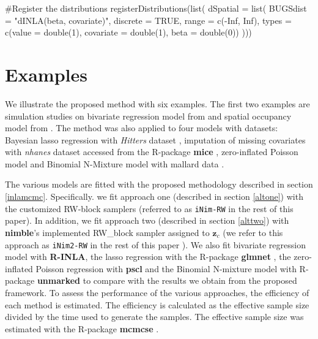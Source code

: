 \documentclass[
]{article}
\newenvironment{Shaded}{\begin{snugshade}}{\end{snugshade}}
\newcommand{\AttributeTok}[1]{\textcolor[rgb]{0.40,0.45,0.13}{#1}}
\newcommand{\CommentTok}[1]{\textcolor[rgb]{0.37,0.37,0.37}{#1}}
\newcommand{\ConstantTok}[1]{\textcolor[rgb]{0.56,0.35,0.01}{#1}}
\newcommand{\FunctionTok}[1]{\textcolor[rgb]{0.28,0.35,0.67}{#1}}
\newcommand{\NormalTok}[1]{\textcolor[rgb]{0.00,0.23,0.31}{#1}}
\newcommand{\SpecialCharTok}[1]{\textcolor[rgb]{0.37,0.37,0.37}{#1}}
\newcommand{\StringTok}[1]{\textcolor[rgb]{0.13,0.47,0.30}{#1}}
\begin{document}
\begin{Shaded}
\begin{Highlighting}[]
\CommentTok{\#Register the distributions}
\FunctionTok{registerDistributions}\NormalTok{(}\FunctionTok{list}\NormalTok{(}
  \AttributeTok{dSpatial =} \FunctionTok{list}\NormalTok{(}
    \AttributeTok{BUGSdist =} \StringTok{"dINLA(beta, covariate)"}\NormalTok{,}
    \AttributeTok{discrete =} \ConstantTok{TRUE}\NormalTok{,}
    \AttributeTok{range =} \FunctionTok{c}\NormalTok{(}\SpecialCharTok{{-}}\ConstantTok{Inf}\NormalTok{, }\ConstantTok{Inf}\NormalTok{),}
    \AttributeTok{types =} \FunctionTok{c}\NormalTok{(}\StringTok{\textquotesingle{}value = double(1)\textquotesingle{}}\NormalTok{, }\StringTok{\textquotesingle{}covariate = double(1)\textquotesingle{}}\NormalTok{, }\StringTok{\textquotesingle{}beta = double(0)\textquotesingle{}}\NormalTok{)}
\NormalTok{  )))}
\end{Highlighting}
\end{Shaded}

\hypertarget{examples}{%
\section{Examples}\label{examples}}

We illustrate the proposed method with six examples. The first two
examples are simulation studies on bivariate regression model from
\citet{gomez2018markov} and spatial occupancy model from
\citet{kery2020applied}. The method was also applied to four models with
datasets: Bayesian lasso regression with \textit{Hitters} dataset
\citep{gareth2013introduction}, imputation of missing covariates with
\textit{nhanes} dataset accessed from the R-package \textbf{mice}
\citep{van2011mice}, zero-inflated Poisson model and Binomial N-Mixture
model with mallard data \citep{unmarked}.

The various models are fitted with the proposed methodology described in
section \ref{inlamcmc}. Specifically. we fit approach one (described in
section \ref{altone}) with the customized RW-block samplers (referred to
as \texttt{iNim-RW} in the rest of this paper). In addition, we fit
approach two (described in section \ref{alttwo}) with \textbf{nimble}'s
implemented RW\_block sampler assigned to \(\mathbf{z}_{c}\) (we refer
to this approach as \texttt{iNim2-RW} in the rest of this paper ). We
also fit bivariate regression model with \textbf{R-INLA}, the lasso
regression with the R-package \textbf{glmnet} \citep{glmnet}, the
zero-inflated Poisson regression with \textbf{pscl}\citep{pscl} and the
Binomial N-mixture model with R-package \textbf{unmarked}
\citep{unmarked} to compare with the results we obtain from the proposed
framework. To assess the performance of the various approaches, the
efficiency of each method is estimated. The efficiency is calculated as
the effective sample size divided by the time used to generate the
samples. The effective sample size was estimated with the R-package
\textbf{mcmcse} \citep{mcmcse}.
\end{document}
